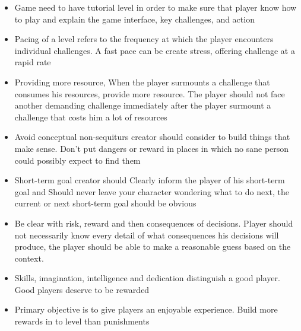 \documentclass[journal]{IEEEtran}										    %
\begin{document}
                \begin{itemize}
                    \item   Game need to have tutorial level in order to make sure that 
                    player know how to play and explain the game interface, key 
                    challenges, and action
                
                    \item   Pacing of a level refers to the frequency at which the 
                    player encounters individual challenges. A fast pace can be 
                    create stress, offering challenge at a rapid rate

                    \item   Providing more resource, When the player surmounts a 
                    challenge that consumes his 	resources, provide more resource.
                    The player should not face another demanding challenge immediately 
                    after the player surmount a challenge that costs him a lot of resources
                    
                    \item   Avoid conceptual non-sequiturs creator should consider 
                    to build things that make sense. Don’t put dangers or reward 
                    in places in which no sane person could possibly expect to find them
                    
                    \item   Short-term goal creator should Clearly inform the player 
                    of his short-term goal and Should never leave your character 
                    wondering what to do next, the current or next short-term goal 
                    should be obvious
                    
                    \item   Be clear with risk, reward and then consequences of decisions. 
                    Player should not necessarily know every detail of what 
                    consequences his decisions will produce, the player should be 
                    able to make a reasonable guess based on the context.

                    \item   Skills, imagination, intelligence and dedication distinguish 
                    a good player. Good players deserve to be rewarded

                    \item   Primary objective is to give players an enjoyable experience. 
                    Build more rewards in to level than punishments


\end{itemize}
\end{document}
